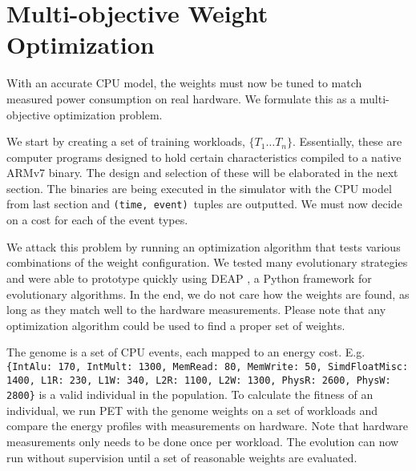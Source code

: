 \section{Multi-objective Weight Optimization}

With an accurate CPU model, the weights must now be tuned to match measured
power consumption on real hardware. We formulate this as a multi-objective
optimization problem.

We start by creating a set of training workloads, $\{T_1 \dots T_n \}$.
Essentially, these are computer programs designed to hold certain
characteristics compiled to a native ARMv7 binary. The design and selection of
these will be elaborated in the next section. The binaries are being executed in
the simulator with the CPU model from last section and \texttt{(time,
event)} tuples are outputted. We must now decide on a cost for each of the event
types.

We attack this problem by running an optimization
algorithm that tests various combinations of the weight configuration. We tested
many evolutionary strategies and were able to prototype quickly using DEAP
\cite{DEAP_JMLR2012}, a Python framework for evolutionary algorithms. In the
end, we do not care how the weights are found, as long as they match well to the
hardware measurements. Please note that any optimization algorithm could be used
to find a proper set of weights.

The genome is a set of CPU events, each mapped to an energy cost. E.g.
\texttt{\{IntAlu: 170, IntMult: 1300, MemRead: 80, MemWrite: 50, SimdFloatMisc:
1400, L1R: 230, L1W: 340, L2R: 1100, L2W: 1300, PhysR: 2600, PhysW: 2800\}} is a
valid individual in the population. To calculate the fitness of an individual,
we run PET with the genome weights on a set of workloads and compare the energy
profiles with measurements on hardware. Note that hardware measurements only
needs to be done once per workload. The evolution can now run without
supervision until a set of reasonable weights are evaluated.
